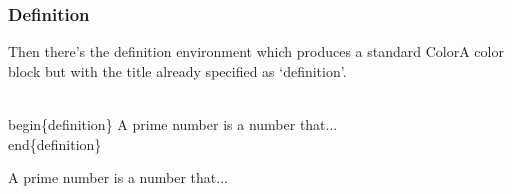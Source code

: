 \label{definition}
\begin{frame}\frametitle{Definition}
  Then there’s the definition environment which produces a standard ColorA color block but with the title already specified as ‘definition’.
  \begin{semiverbatim}
    \\begin\{definition\}\newline
    A prime number is a number that...\newline
    \\end\{definition\}
  \end{semiverbatim}
  \begin{definition}
    A prime number is a number that...
  \end{definition}
\end{frame}
